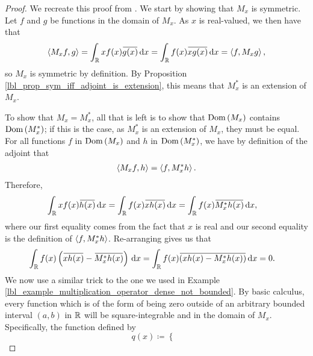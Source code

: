 \begin{proof}
  We recreate this proof from {\cite[Theorem 10.7-2]{kreyszig}}. We start by showing that $M_x$ is symmetric.  Let $f$ and $g$ be functions in the domain of $M_x$. As $x$ is real-valued, we then have that
  \begin{align*}
    \ip{M_x f, g}
    =
    \int_{\R} xf(x)\conjugate{g(x)} \, \mathrm{d}x
    =
    \int_{\R} f(x)\conjugate{xg(x)} \, \mathrm{d}x
    =
    \ip{f, M_x g},
  \end{align*}
  so $M_x$ is symmetric by definition.  By Proposition \eqref{lbl_prop_sym_iff_adjoint_is_extension}, this means that $M_x^*$ is an extension of $M_x$.

  \medskip

  To show that $M_x = M_x^*$, all that is left is to show that $\operatorname{Dom}\left(M_x\right)$ contains $\operatorname{Dom}\left(M_x^*\right)$;  if this is the case, as $M_x^*$ is an extension of $M_x$, they must be equal. For all functions $f$ in $\operatorname{Dom}\left(M_x\right)$ and $h$ in $\operatorname{Dom}\left(M_x^*\right)$, we have by definition of the adjoint that
  \begin{align*}
    \left\langle M_x f, h\right\rangle
    =
    \left\langle f, M_x^* h\right\rangle.
  \end{align*}
  Therefore,
  \begin{align*}
    \int_{\R} xf(x)\conjugate{h(x)} \, \mathrm{d}x
    &=
    \int_{\R} f(x)\conjugate{xh(x)} \, \mathrm{d}x
    =
    \int_{\R} f(x)\conjugate{M_x^* h(x)} \, \mathrm{d}x,
  \end{align*}
  where our first equality comes from the fact that $x$ is real and our second equality is the definition of $\left\langle f, M_x^* h\right\rangle$. Re-arranging gives us that
  \begin{equation}
  \begin{aligned}\label{lbl_eq_multiplication_op_sa_eq}
    \int_\R  f(x) \left( \conjugate{xh(x)} - \conjugate{M_x^* h(x)} \right) \,\mathrm{d}x
    &=
    \int_\R  f(x) \conjugate{\left( xh(x) - M_x^* h(x) \right)} \,\mathrm{d}x
    =
    0.
  \end{aligned}
  \end{equation}
  We now use a similar trick  to the one we used in Example \eqref{lbl_example_multiplication_operator_dense_not_bounded}. By basic calculus, every function which is of the form of being zero outside of an arbitrary bounded interval $(a,b)$ in $\mathbb{R}$ will be square-integrable and in the domain of $M_x$. Specifically, the function defined by
  \begin{equation*}
    q(x)
    \coloneqq
    \begin{cases}

\end{cases}
\end{equation*}
\end{proof}
